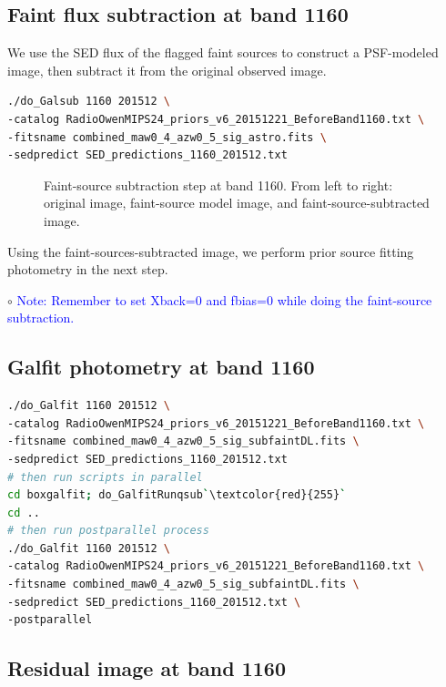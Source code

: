 \documentclass[11pt,a4paper]{article}
\begin{document}
\subsection{Faint flux subtraction at band 1160}
\label{Band1160_Galsub}

We use the SED flux of the flagged faint sources to construct a PSF-modeled image, then subtract it from the original observed image. 

\begin{lstlisting}[language=bash]
./do_Galsub 1160 201512 \
-catalog RadioOwenMIPS24_priors_v6_20151221_BeforeBand1160.txt \
-fitsname combined_maw0_4_azw0_5_sig_astro.fits \
-sedpredict SED_predictions_1160_201512.txt
\end{lstlisting}

\begin{figure}[H]
	\caption{Faint-source subtraction step at band 1160. From left to right: original image, faint-source model image, and faint-source-subtracted image.}
\end{figure}

Using the faint-sources-subtracted image, we perform prior source fitting photometry in the next step. 

\indent\hspace{15pt}$\circ$ 
\textcolor{blue}{Note: Remember to set Xback=0 and fbias=0 while doing the faint-source subtraction.}
\\

\subsection{Galfit photometry at band 1160}
\label{Band1160_Galfit}

\begin{lstlisting}[language=bash]
./do_Galfit 1160 201512 \
-catalog RadioOwenMIPS24_priors_v6_20151221_BeforeBand1160.txt \
-fitsname combined_maw0_4_azw0_5_sig_subfaintDL.fits \
-sedpredict SED_predictions_1160_201512.txt
# then run scripts in parallel 
cd boxgalfit; do_GalfitRunqsub`\textcolor{red}{255}`
cd ..
# then run postparallel process
./do_Galfit 1160 201512 \
-catalog RadioOwenMIPS24_priors_v6_20151221_BeforeBand1160.txt \
-fitsname combined_maw0_4_azw0_5_sig_subfaintDL.fits \
-sedpredict SED_predictions_1160_201512.txt \
-postparallel
\end{lstlisting}

\subsection{Residual image at band 1160}
\label{Band1160_Galres}
\end{document}
